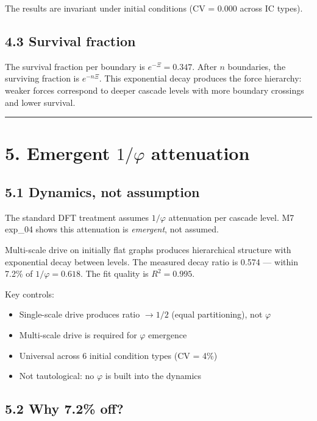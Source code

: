 \documentclass[11pt,a4paper]{article}
\providecommand{\tightlist}{\setlength{\itemsep}{0pt}\setlength{\parskip}{0pt}}
\begin{document}
The results are invariant under initial conditions (CV = 0.000 across IC types).

\subsection*{4.3 Survival fraction}

The survival fraction per boundary is $e^{-\Xi} = 0.347$. After $n$ boundaries, the surviving fraction is $e^{-n\Xi}$. This exponential decay produces the force hierarchy: weaker forces correspond to deeper cascade levels with more boundary crossings and lower survival.

\begin{center}\rule{0.5\linewidth}{0.4pt}\end{center}

\section*{5. Emergent $1/\varphi$ attenuation}

\subsection*{5.1 Dynamics, not assumption}

The standard DFT treatment assumes $1/\varphi$ attenuation per cascade level. M7 exp\_04 shows this attenuation is \emph{emergent}, not assumed.

Multi-scale drive on initially flat graphs produces hierarchical structure with exponential decay between levels. The measured decay ratio is 0.574 — within 7.2\% of $1/\varphi = 0.618$. The fit quality is $R^2 = 0.995$.

Key controls:
\begin{itemize}\tightlist
\item Single-scale drive produces ratio $\to 1/2$ (equal partitioning), not $\varphi$
\item Multi-scale drive is required for $\varphi$ emergence
\item Universal across 6 initial condition types (CV = 4\%)
\item Not tautological: no $\varphi$ is built into the dynamics
\end{itemize}

\subsection*{5.2 Why 7.2\% off?}
\end{document}
